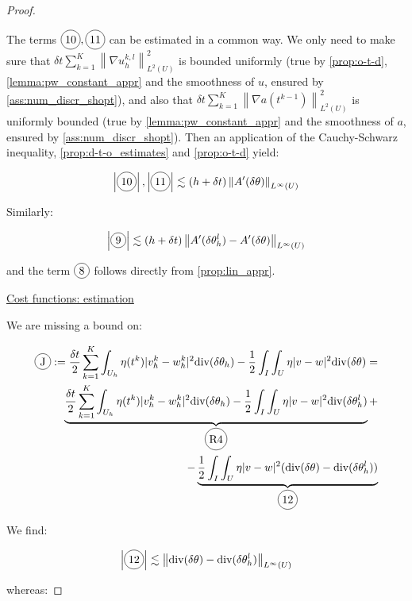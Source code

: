 \documentclass[english,a4paper,9pt,oneside]{scrbook}	%
\theoremstyle{break}
\newenvironment{mproof}[1][\proofname]{%
  \begin{proof}[#1]$ $\par\nobreak\ignorespaces
}{%
  \end{proof}
}
\renewcommand*{\proofname}{Proof}
\theoremstyle{remark}
\newcommand{\ds}{\displaystyle}
\newcommand{\norm}[1]{\left\lVert#1\right\rVert}
\newcommand{\te}{\theta}
\newcommand{\dive}{\text{div}}
\newcommand*\circled[1]{\tikz[baseline=(char.base)]{
            \node[shape=circle,draw,inner sep=2pt] (char) {#1};}}
\begin{document}
\begin{mproof}
The terms $\circled{10}, \circled{11}$ can be estimated in a common way. We only need to make sure that $\ds \delta t \sum_{k=1}^{K} \norm{\nabla u_h^{k,l}}_{L^2(U)}^2 $ is bounded uniformly (true by \cref{prop:o-t-d}, \cref{lemma:pw_constant_appr} and the smoothness of $u$, ensured by \cref{ass:num_discr_shopt}), and also that $\ds \delta t \sum_{k=1}^{K} \norm{\nabla a(t^{k-1})}_{L^2(U)}^2$ is uniformly bounded (true by \cref{lemma:pw_constant_appr} and the smoothness of $a$, ensured by \cref{ass:num_discr_shopt}). Then an application of the Cauchy-Schwarz inequality, \cref{prop:d-t-o_estimates} and \cref{prop:o-t-d} yield:

\begin{align*}
	\left | \circled{10} \right |, \left |\circled{11}\right | \lesssim (h+\delta t) \norm{A'(\delta \te)}_{L^\infty(U)}
\end{align*}

Similarly:

\begin{align*}
	\left | \circled{9} \right | \lesssim (h+\delta t) \norm{A'(\delta \te_h^l)-A'(\delta \te)}_{L^\infty(U)}
\end{align*}

and the term $\circled{8}$ follows directly from \cref{prop:lin_appr}.

\underline{Cost functions: estimation}

We are missing a bound on: 

\begin{align*}
	\circled{J}:=\frac{\delta t}{2} \sum_{k=1}^{K} \int_{U_h} \eta(t^k)|v_h^k-w_h^k|^2  \dive(\delta \theta_h ) - \frac{1}{2}\int_I\int_{U}\eta |v-w|^2\dive(\delta \te) = \\
	\underbrace{\frac{\delta t}{2} \sum_{k=1}^{K} \int_{U_h} \eta(t^k)|v_h^k-w_h^k|^2  \dive(\delta \theta_h ) - \frac{1}{2}\int_I\int_{U}\eta |v-w|^2\dive(\delta \te_h^l)}_{\circled{R4}}+\\
	-\underbrace{ \frac{1}{2}\int_I\int_{U}\eta |v-w|^2(\dive(\delta \te) - \dive(\delta \te_h^l))}_{\circled{12}}
\end{align*}

We find:

\begin{align*}
	\left | \circled{12} \right | \lesssim \norm{\dive(\delta \te) - \dive(\delta \te_h^l)}_{L^\infty(U)}
\end{align*}

whereas:


\end{mproof}
\end{document}
